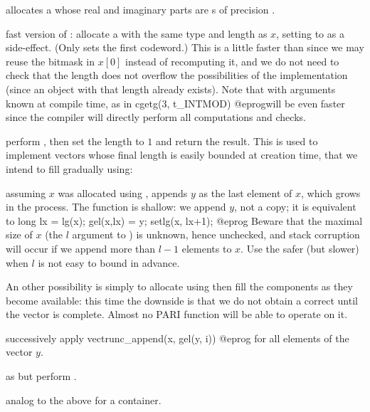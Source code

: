  allocates a  whose real and
imaginary parts are s of precision .

 fast version of :
allocate a  with the same type and length as $x$, setting 
to  as a side-effect. (Only sets the first codeword.) This is
a little faster than  since we may reuse the bitmask in
$x[0]$ instead of recomputing it, and we do not need to check that the
length does not overflow the possibilities of the
implementation (since an object with that length already exists). Note that
 with arguments known at compile time, as in
\bprog
  cgetg(3, t_INTMOD)
@eprog\noindent will be even faster since the compiler will directly perform
all computations and checks.

 perform , then
set the length to $1$ and return the result. This is used to  implement
vectors whose final length is easily bounded at creation time, that we intend
to fill gradually using:

 assuming $x$ was allocated using
, appends $y$ as the last element of $x$, which
grows in the process. The function is shallow: we append $y$, not a copy;
it is equivalent to
\bprog
  long lx = lg(x); gel(x,lx) = y; setlg(x, lx+1);
@eprog\noindent
Beware that the maximal size of $x$ (the $l$ argument to )
is unknown, hence unchecked, and stack corruption will occur if we append
more than $l-1$ elements to $x$. Use the safer (but slower)
 when $l$ is not easy to bound in advance.

An other possibility is simply to allocate using  then fill
the components as they become available: this time the downside is that we do
not obtain a correct  until the vector is complete. Almost no PARI
function will be able to operate on it.

 successively apply
\bprog
  vectrunc_append(x, gel(y, i))
@eprog
for all elements of the vector $y$.

 as  but perform
.


 analog to the above for a
 container.

